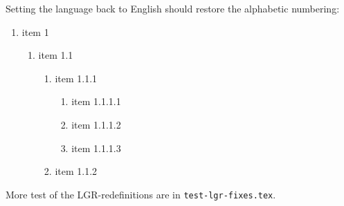 \documentclass[a4paper]{article}
\newcommand{\file}{\texttt}
\begin{document}
Setting the language back to English should restore the alphabetic numbering:
\begin{enumerate}
  \item item 1
  \begin{enumerate}
    \item item 1.1
    \begin{enumerate}
      \item item 1.1.1
       \begin{enumerate}
         \item item 1.1.1.1
         \item item 1.1.1.2
         \item item 1.1.1.3
       \end{enumerate}
      \item item 1.1.2
    \end{enumerate}
  \end{enumerate}
\end{enumerate}

More test of the LGR-redefinitions are in \file{test-lgr-fixes.tex}.

\ifdefined\lgrfont
\else
  
\end{document}
